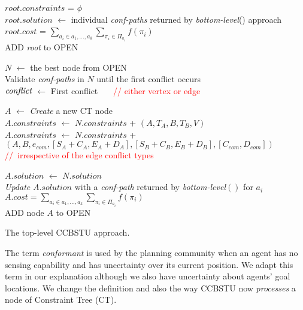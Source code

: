 \documentclass{article}
\begin{document}
\begin{algorithm}[h]
  \SetAlgoLined
  $root.constraints$ = $\phi$ \\
  $root.solution$ $\leftarrow$ individual \emph{conf-paths}       returned by \emph{bottom-level}() approach \\
  $root.cost$ = 
   		$\sum_{a_i \in {a_1,...,a_k}}
   			\sum_{\pi_i \in \Pi_{a_i}} f(\pi_i)$ \\
   
  ADD \emph{root} to OPEN \\  
  {
  	$N$ $\leftarrow$ the best node from OPEN \\
  	Validate \emph{conf-paths} in $N$ until the first conflict occurs \\
    $\emph{conflict}$ 
    		$\leftarrow$ First conflict  ~~~\textcolor{red}{// either vertex or edge} \\
    {
    	$A$ $\leftarrow$ \emph{Create} a new CT node \\
        {
        	$A.constraints$ $\leftarrow$ $N.constraints$ + $(A,T_A,B,T_B,V)$ \\
        }
        \Else
        {
        	$A.constraints$ $\leftarrow$ $N.constraints$ + 
            	$(A,B,e_{com},[S_A+C_A,E_A+D_A],[S_B+C_B,E_B+D_B], [C_{com},D_{com}])$ \textcolor{red}{//~irrespective of the edge conflict types} 
        }
        
        $A.solution$ $\leftarrow$ $N.solution$ \\
        \emph{Update} $A.solution$ with a \emph{conf-path} 
         	returned by \emph{bottom-level}$()$ for $a_i$\\
        $A.cost = \sum_{a_i \in {a_1,...,a_k}}
   			\sum_{\pi_i \in \Pi_{a_i}} f(\pi_i)$ \\
        ADD node $A$ to OPEN \\    
    }
  }   
  \caption{The top-level CCBSTU approach.}
  \label{algo.ccbstu}
\end{algorithm}

The term \emph{conformant} is used by the planning community when an agent has no sensing capability and has uncertainty over its current position. We adapt this term in our explanation although we also have uncertainty about agents' goal locations. We change the definition and also the way CCBSTU now \emph{processes} a node of Constraint Tree (CT). 
%
\end{document}
